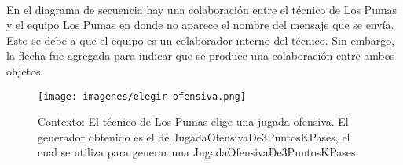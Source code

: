 ~

En el diagrama de secuencia hay una colaboración entre el técnico de Los Pumas y el equipo Los Pumas en donde no aparece el nombre del mensaje que se envía.
Esto se debe a que el equipo es un colaborador interno del técnico. Sin embargo, la flecha fue agregada para indicar que se produce una colaboración entre
ambos objetos.

\newpage
\begin{landscape}

\begin{figure}[h!]
   \texttt{[image: imagenes/elegir-ofensiva.png]}
   \caption{Contexto: El técnico de Los Pumas elige una jugada ofensiva. El generador obtenido es el de JugadaOfensivaDe3PuntosKPases, el cual se utiliza para
   generar una JugadaOfensivaDe3PuntosKPases}
\end{figure}

\end{landscape}
\newpage

